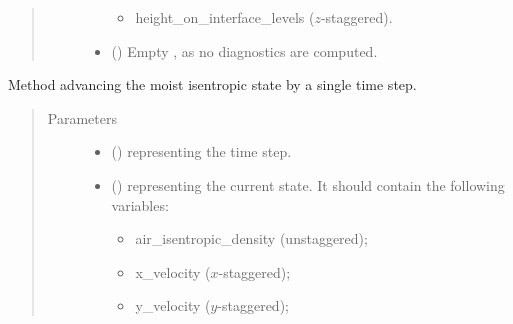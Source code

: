 \documentclass[letterpaper,10pt,english]{sphinxmanual}
\begin{document}
\begin{fulllineitems}
\begin{fulllineitems}
\begin{quote}
\begin{description}
\begin{itemize}
\begin{itemize}
\item {} 
height\_on\_interface\_levels (\(z\)-staggered).

\end{itemize}

\item {} 
 () \textendash{} Empty , as no diagnostics are computed.

\end{itemize}


\end{description}\end{quote}

\end{fulllineitems}


\begin{fulllineitems}
\label{\detokenize{api:tasmania.dycore.dycore_isentropic_nonconservative.DynamicalCoreIsentropicNonconservative._step_moist}}
Method advancing the moist isentropic state by a single time step.
\begin{quote}\begin{description}
\item[{Parameters}] \leavevmode\begin{itemize}
\item {} 
 () \textendash{}  representing the time step.

\item {} 
 () \textendash{} 
{\hyperref[\detokenize{api:tasmania.storages.state_isentropic.StateIsentropic}]{}} representing the current state.
It should contain the following variables:
\begin{itemize}
\item {} 
air\_isentropic\_density (unstaggered);

\item {} 
x\_velocity (\(x\)-staggered);

\item {} 
y\_velocity (\(y\)-staggered);


\end{itemize}
\end{itemize}
\end{description}
\end{quote}
\end{fulllineitems}
\end{fulllineitems}
\end{document}
